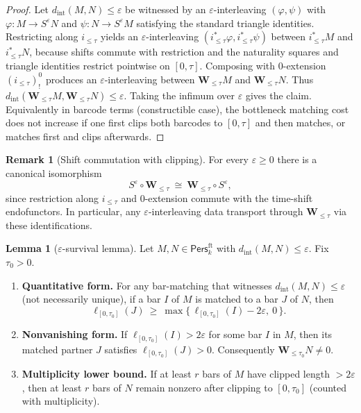 \documentclass[11pt]{article}
\numberwithin{equation}{section}
\theoremstyle{plain}
\theoremstyle{definition}
\theoremstyle{remark}
\newcommand{\Pers}{\mathsf{Pers}}
\theoremstyle{plain}
\theoremstyle{definition}
\numberwithin{equation}{section}
\newtheorem{lemma}[theorem]{Lemma}
\theoremstyle{definition}
\newtheorem{remark}[theorem]{Remark}
\numberwithin{equation}{section}
\theoremstyle{plain}
\theoremstyle{definition}
\theoremstyle{remark}
\begin{document}
\begin{proof}
Let \(d_{\mathrm{int}}(M,N)\le\varepsilon\) be witnessed by an \(\varepsilon\)-interleaving \((\varphi,\psi)\) with \(\varphi:M\to S^\varepsilon N\) and \(\psi:N\to S^\varepsilon M\) satisfying the standard triangle identities. Restricting along \(i_{\le\tau}\) yields an \(\varepsilon\)-interleaving \((i_{\le\tau}^\ast\varphi,i_{\le\tau}^\ast\psi)\) between \(i_{\le\tau}^\ast M\) and \(i_{\le\tau}^\ast N\), because shifts commute with restriction and the naturality squares and triangle identities restrict pointwise on \([0,\tau]\). Composing with \(0\)-extension \((i_{\le\tau})^{0}_!\) produces an \(\varepsilon\)-interleaving between \(\mathbf{W}_{\le\tau}M\) and \(\mathbf{W}_{\le\tau}N\). Thus \(d_{\mathrm{int}}(\mathbf{W}_{\le\tau}M,\mathbf{W}_{\le\tau}N)\le\varepsilon\). Taking the infimum over \(\varepsilon\) gives the claim.
Equivalently in barcode terms (constructible case), the bottleneck matching cost does not increase if one first clips both barcodes to \([0,\tau]\) and then matches, or matches first and clips afterwards.
\end{proof}

\begin{remark}[Shift commutation with clipping]\label{I:rk:shift-clip}
For every \(\varepsilon\ge 0\) there is a canonical isomorphism
\[
S^\varepsilon\circ \mathbf{W}_{\le\tau}\ \cong\ \mathbf{W}_{\le\tau}\circ S^\varepsilon,
\]
since restriction along \(i_{\le\tau}\) and \(0\)-extension commute with the time-shift endofunctors. In particular, any \(\varepsilon\)-interleaving data transport through \(\mathbf{W}_{\le\tau}\) via these identifications.
\end{remark}

\begin{lemma}[\texorpdfstring{$\varepsilon$}{epsilon}-survival lemma]\label{I:lem:survive}
Let \(M,N\in\Pers^{\mathrm{ft}}_k\) with \(d_{\mathrm{int}}(M,N)\le\varepsilon\). Fix \(\tau_0>0\).
\begin{enumerate}\itemsep0.25em
\item \textbf{Quantitative form.} For any bar-matching that witnesses \(d_{\mathrm{int}}(M,N)\le\varepsilon\) (not necessarily unique), if a bar \(I\) of \(M\) is matched to a bar \(J\) of \(N\), then
\[
\ell_{[0,\tau_0]}(J)\ \ge\ \max\bigl\{\,\ell_{[0,\tau_0]}(I)-2\varepsilon,\ 0\,\bigr\}.
\]
\item \textbf{Nonvanishing form.} If \(\ell_{[0,\tau_0]}(I)>2\varepsilon\) for some bar \(I\) in \(M\), then its matched partner \(J\) satisfies \(\ell_{[0,\tau_0]}(J)>0\). Consequently \(\mathbf{W}_{\le \tau_0}N\neq 0\).
\item \textbf{Multiplicity lower bound.} If at least \(r\) bars of \(M\) have clipped length \(>\!2\varepsilon\), then at least \(r\) bars of \(N\) remain nonzero after clipping to \([0,\tau_0]\) (counted with multiplicity).
\end{enumerate}
\end{lemma}
\end{document}
